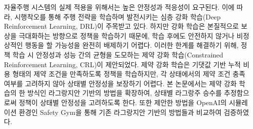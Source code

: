 
자율주행 시스템의 실제 적용을 위해서는 높은 안정성과 적응성이 요구된다.
이에 따라, 시행착오를 통해 주행 전략을 학습하며 발전시키는 심층 강화 학습(Deep Reinforcement Learning, DRL)이 주목받고 있다.
하지만 강화 학습은 본질적으로 보상을 극대화하는 방향으로 정책을 학습하기 때문에, 학습 후에도 안전하지 않거나 비정상적인 행동을 할 가능성을 완전히 배제하기 어렵다.
이러한 한계를 해결하기 위해, 정책 학습 시 안정성과 성능 간의 균형을 도모하는 제약 강화 학습(Constrained Reinforcement Learning, CRL)이 제안되었다.
제약 강화 학습은 기댓값 기반 누적 비용 형태의 제약 조건을 만족하도록 정책을 학습하지만, 각 상태에서의 제약 조건 충족 여부를 고려하지 않아 상태별 안정성을 보장하기 어렵다.
본 논문에서는 제약 강화 학습의 한 방식인 라그랑지안 기반의 방법을 확장하여, 상태별 라그랑주 승수를 추정함으로써 정책이 상태별 안정성을 고려하도록 한다.
또한 제안한 방법을 OpenAI의 시뮬레이션 환경인 Safety Gym을 통해 기존 라그랑지안 기반의 방법들과 비교하여 검증하였다.